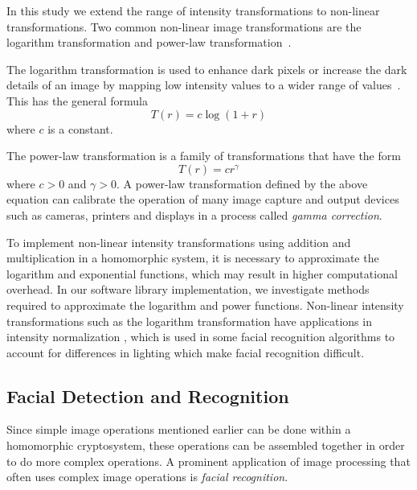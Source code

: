In this study we extend the range of intensity transformations to non-linear transformations. Two common non-linear image transformations are the logarithm transformation and power-law transformation~\cite{gonzalez_digital_2008}.

The logarithm transformation is used to enhance dark pixels or increase the dark details of an image by mapping low intensity values to a wider range of values~\cite{gonzalez_digital_2008}. This has the general formula
\begin{equation}
    T\left(r\right) = c \log\left(1 + r\right)
\end{equation}
where $c$ is a constant.

The power-law transformation is a family of transformations that have the form
\begin{equation}
    T\left(r\right) = c r^{\gamma}
\end{equation}
where $c>0$ and $\gamma > 0$.
A power-law transformation defined by the above equation can calibrate the operation of many image capture and output devices such as cameras, printers and displays in a process called \textit{gamma correction}.

To implement non-linear intensity transformations using addition and multiplication in a homomorphic system, it is necessary to approximate the logarithm and exponential functions, which may result in higher computational overhead. In our software library implementation, we investigate methods required to approximate the logarithm and power functions. Non-linear intensity transformations such as the logarithm transformation have applications in intensity normalization \cite{oravec_illumination_2010}, which is used in some facial recognition algorithms to account for differences in lighting which make facial recognition difficult.

\subsection{Facial Detection and Recognition}

Since simple image operations mentioned earlier can be done within a homomorphic cryptosystem, these operations can be assembled together in order to do more complex operations. A prominent application of image processing that often uses complex image operations is \textit{facial recognition}.

